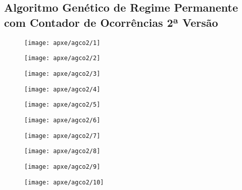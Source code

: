 \subsection{Algoritmo Genético de Regime Permanente com Contador de Ocorrências 2ª Versão}

\begin{figure}[H]
\centering

\texttt{[image: apxe/agco2/1]}

\end{figure}

\begin{figure}[H]
\centering

\texttt{[image: apxe/agco2/2]}

\end{figure}

\begin{figure}[H]
\centering

\texttt{[image: apxe/agco2/3]}

\end{figure}

\begin{figure}[H]
\centering

\texttt{[image: apxe/agco2/4]}

\end{figure}

\begin{figure}[H]
\centering

\texttt{[image: apxe/agco2/5]}

\end{figure}

\begin{figure}[H]
\centering

\texttt{[image: apxe/agco2/6]}

\end{figure}

\begin{figure}[H]
\centering

\texttt{[image: apxe/agco2/7]}

\end{figure}

\begin{figure}[H]
\centering

\texttt{[image: apxe/agco2/8]}

\end{figure}

\begin{figure}[H]
\centering

\texttt{[image: apxe/agco2/9]}

\end{figure}

\begin{figure}[H]
\centering

\texttt{[image: apxe/agco2/10]}

\end{figure}


